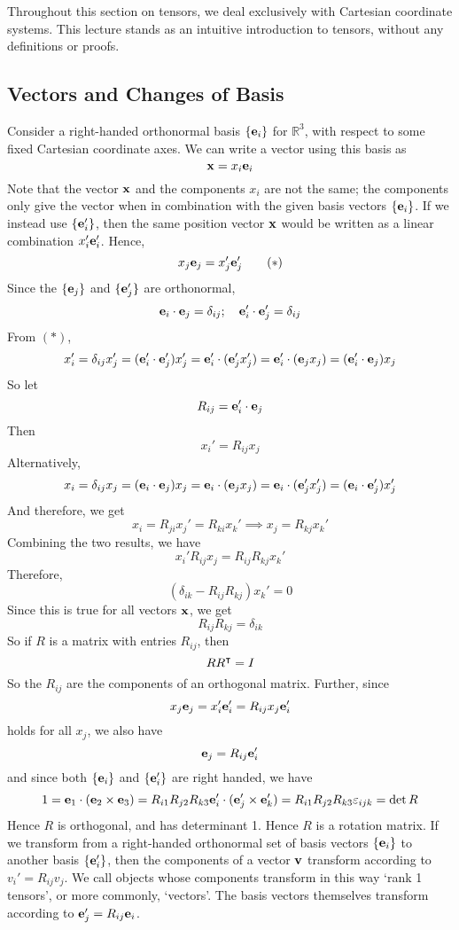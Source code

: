 Throughout this section on tensors, we deal exclusively with Cartesian coordinate systems. This lecture stands as an intuitive introduction to tensors, without any definitions or proofs.
\subsection{Vectors and Changes of Basis}
Consider a right-handed orthonormal basis \(\{ \vb e_i \}\) for \(\mathbb R^3\), with respect to some fixed Cartesian coordinate axes. We can write a vector using this basis as
\[ \vb x = x_i \vb e_i \]
Note that the vector \(\vb x\) and the components \(x_i\) are not the same; the components only give the vector when in combination with the given basis vectors \(\{ \vb e_i \}\). If we instead use \(\{ \vb e'_i \}\), then the same position vector \(\vb x\) would be written as a linear combination \(x'_i \vb e'_i\). Hence,
\begin{equation}
	x_j \vb e_j = x'_j \vb e'_j
	\tag{\(\ast\)}
\end{equation}
Since the \(\{ \vb e_j \}\) and \(\{ \vb e'_j \}\) are orthonormal,
\[ \vb e_i \cdot \vb e_j = \delta_{ij};\quad \vb e'_i \cdot \vb e'_j = \delta_{ij} \]
From \((\ast)\),
\[ x_i' = \delta_{ij} x_j' = (\vb e_i' \cdot \vb e_j') x_j' = \vb e_i' \cdot (\vb e_j' x_j') = \vb e_i' \cdot (\vb e_j x_j) = (\vb e_i' \cdot \vb e_j) x_j \]
So let
\[ R_{ij} = \vb e_i' \cdot \vb e_j \]
Then
\[ x_i' = R_{ij} x_j \]
Alternatively,
\[ x_i = \delta_{ij} x_j = (\vb e_i \cdot \vb e_j) x_j = \vb e_i \cdot (\vb e_j x_j) = \vb e_i \cdot (\vb e_j' x_j') = (\vb e_i \cdot \vb e_j') x_j' \]
And therefore, we get
\[ x_i = R_{ji} x_j' = R_{ki} x_k' \implies x_j = R_{kj} x_k' \]
Combining the two results, we have
\[ x_i' R_{ij} x_j = R_{ij} R_{kj} x_k' \]
Therefore,
\[ (\delta_{ik} - R_{ij}R_{kj}) x_k' = 0 \]
Since this is true for all vectors \(\vb x\), we get
\[ R_{ij}R_{kj} = \delta_{ik} \]
So if \(R\) is a matrix with entries \(R_{ij}\), then
\[ R R^\intercal = I \]
So the \(R_{ij}\) are the components of an orthogonal matrix. Further, since
\[ x_j \vb e_j = x_i' \vb e_i' = R_{ij} x_j \vb e_i' \]
holds for all \(x_j\), we also have
\[ \vb e_j = R_{ij} \vb e_i' \]
and since both \(\{ \vb e_i \}\) and \(\{ \vb e_i' \}\) are right handed, we have
\[ 1 = \vb e_1 \cdot (\vb e_2 \times \vb e_3) = R_{i1} R_{j2} R_{k3} \vb e_i' \cdot (\vb e_j' \times \vb e_k') = R_{i1} R_{j2} R_{k3} \varepsilon_{ijk} = \det R \]
Hence \(R\) is orthogonal, and has determinant 1. Hence \(R\) is a rotation matrix. If we transform from a right-handed orthonormal set of basis vectors \(\{ \vb e_i \}\) to another basis \(\{ \vb e_i' \}\), then the components of a vector \(\vb v\) transform according to \(v_i' = R_{ij} v_j\). We call objects whose components transform in this way `rank 1 tensors', or more commonly, `vectors'. The basis vectors themselves transform according to \(\vb e_j' = R_{ij} \vb e_i\).

